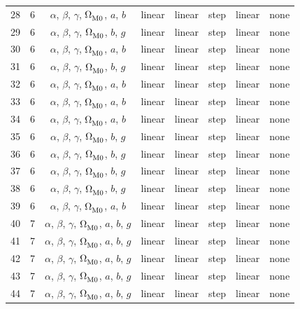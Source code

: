 \begin{longtable}{c c c c c c c c}
    28 & 6 & $\alpha$, $\beta$, $\gamma$, $\Omega_{\rm M0}^{}$, $a$, $b$ & linear & linear & step & linear & none \\
    29 & 6 & $\alpha$, $\beta$, $\gamma$, $\Omega_{\rm M0}^{}$, $b$, $g$ & linear & linear & step & linear & none \\
    30 & 6 & $\alpha$, $\beta$, $\gamma$, $\Omega_{\rm M0}^{}$, $a$, $b$ & linear & linear & step & linear & none \\
    31 & 6 & $\alpha$, $\beta$, $\gamma$, $\Omega_{\rm M0}^{}$, $b$, $g$ & linear & linear & step & linear & none \\
    32 & 6 & $\alpha$, $\beta$, $\gamma$, $\Omega_{\rm M0}^{}$, $a$, $b$ & linear & linear & step & linear & none \\
    33 & 6 & $\alpha$, $\beta$, $\gamma$, $\Omega_{\rm M0}^{}$, $a$, $b$ & linear & linear & step & linear & none \\
    34 & 6 & $\alpha$, $\beta$, $\gamma$, $\Omega_{\rm M0}^{}$, $a$, $b$ & linear & linear & step & linear & none \\
    35 & 6 & $\alpha$, $\beta$, $\gamma$, $\Omega_{\rm M0}^{}$, $b$, $g$ & linear & linear & step & linear & none \\
    36 & 6 & $\alpha$, $\beta$, $\gamma$, $\Omega_{\rm M0}^{}$, $b$, $g$ & linear & linear & step & linear & none \\
    37 & 6 & $\alpha$, $\beta$, $\gamma$, $\Omega_{\rm M0}^{}$, $b$, $g$ & linear & linear & step & linear & none \\
    38 & 6 & $\alpha$, $\beta$, $\gamma$, $\Omega_{\rm M0}^{}$, $b$, $g$ & linear & linear & step & linear & none \\
    39 & 6 & $\alpha$, $\beta$, $\gamma$, $\Omega_{\rm M0}^{}$, $a$, $b$ & linear & linear & step & linear & none \\
    40 & 7 & $\alpha$, $\beta$, $\gamma$, $\Omega_{\rm M0}^{}$, $a$, $b$, $g$ & linear & linear & step & linear & none \\
    41 & 7 & $\alpha$, $\beta$, $\gamma$, $\Omega_{\rm M0}^{}$, $a$, $b$, $g$ & linear & linear & step & linear & none \\
    42 & 7 & $\alpha$, $\beta$, $\gamma$, $\Omega_{\rm M0}^{}$, $a$, $b$, $g$ & linear & linear & step & linear & none \\
    43 & 7 & $\alpha$, $\beta$, $\gamma$, $\Omega_{\rm M0}^{}$, $a$, $b$, $g$ & linear & linear & step & linear & none \\
    44 & 7 & $\alpha$, $\beta$, $\gamma$, $\Omega_{\rm M0}^{}$, $a$, $b$, $g$ & linear & linear & step & linear & none \\

\end{longtable}
